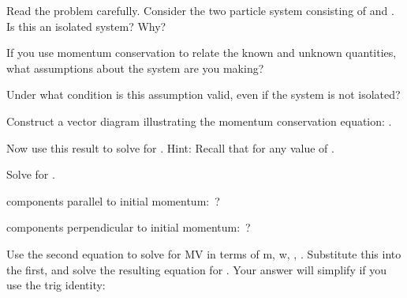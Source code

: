 {{\begin{two-digit-list}
\item [1.]  Read the problem carefully.
            Consider the two particle system consisting of  and .
            Is this an isolated system?
            Why? 

\item [2.]  If you use momentum conservation to relate the known and unknown
            quantities, what assumptions about the system are you making? 

\item [3.]  Under what condition is this assumption valid, even if the system
            is not isolated? 

\item [4.]  Construct a vector diagram illustrating the momentum conservation
            equation: . 

\item [5.]  

\item [6.]  Now use this result to solve for .
            Hint: Recall that \m{\sin(\pi - \alpha) = \sin\alpha} for any value
            of \m{\alpha}. 

\item [7.]  Solve for . 

\item [8.]  

            components parallel to initial momentum: \,?

            components perpendicular to initial momentum: \,? 

\item [9.]  Use the second equation to solve for MV in terms of m, w, \m{\theta},
            \m{\phi}.
            Substitute this into the first, and solve the resulting equation
            for .
            Your answer will simplify if you use the trig identity:


\end{two-digit-list}}}
